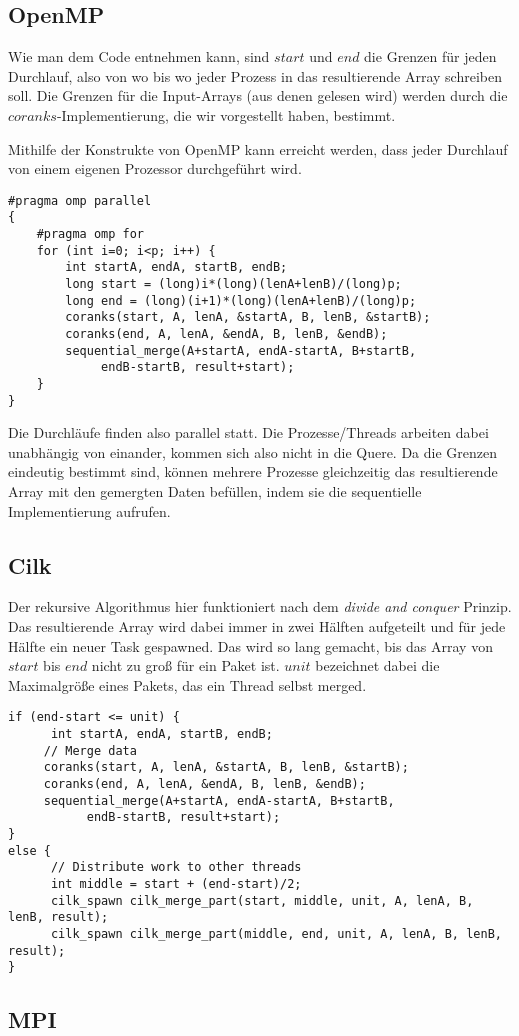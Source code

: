 \subsection{OpenMP}
Wie man dem Code entnehmen kann, sind $start$ und $end$ die Grenzen für jeden Durchlauf, also von wo bis wo jeder Prozess in das resultierende Array schreiben soll. Die Grenzen für die Input-Arrays (aus denen gelesen wird) werden durch die $coranks$-Implementierung, die wir vorgestellt haben, bestimmt.

Mithilfe der Konstrukte von OpenMP kann erreicht werden, dass jeder Durchlauf von einem eigenen Prozessor durchgeführt wird. 
\begin{verbatim}
#pragma omp parallel
{
    #pragma omp for
    for (int i=0; i<p; i++) {
        int startA, endA, startB, endB;
        long start = (long)i*(long)(lenA+lenB)/(long)p;
        long end = (long)(i+1)*(long)(lenA+lenB)/(long)p;
        coranks(start, A, lenA, &startA, B, lenB, &startB);
        coranks(end, A, lenA, &endA, B, lenB, &endB);
        sequential_merge(A+startA, endA-startA, B+startB, 
             endB-startB, result+start);
    }
}
\end{verbatim}
Die Durchläufe finden also parallel statt. Die Prozesse/Threads arbeiten dabei unabhängig von einander, kommen sich also nicht in die Quere. Da die Grenzen eindeutig bestimmt sind, können mehrere Prozesse gleichzeitig das resultierende Array mit den gemergten Daten befüllen, indem sie die sequentielle Implementierung aufrufen.

\subsection{Cilk}
Der rekursive Algorithmus hier funktioniert nach dem \emph{divide and conquer} Prinzip. Das resultierende Array wird dabei immer in zwei Hälften aufgeteilt und für jede Hälfte ein neuer Task gespawned. Das wird so lang gemacht, bis das Array von $start$ bis $end$ nicht zu groß für ein Paket ist. $unit$ bezeichnet dabei die Maximalgröße eines Pakets, das ein Thread selbst merged.
\begin{verbatim}
if (end-start <= unit) {
      int startA, endA, startB, endB;
     // Merge data
     coranks(start, A, lenA, &startA, B, lenB, &startB);
     coranks(end, A, lenA, &endA, B, lenB, &endB);
     sequential_merge(A+startA, endA-startA, B+startB, 
           endB-startB, result+start);
}
else {
      // Distribute work to other threads
      int middle = start + (end-start)/2;
      cilk_spawn cilk_merge_part(start, middle, unit, A, lenA, B, lenB, result);
      cilk_spawn cilk_merge_part(middle, end, unit, A, lenA, B, lenB, result);
}
\end{verbatim}

\subsection{MPI}